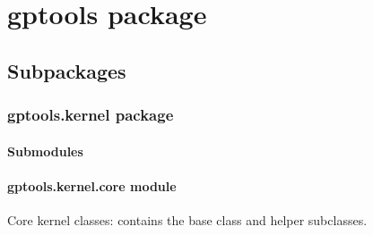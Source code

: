\documentclass[letterpaper,10pt,english]{sphinxmanual}
\begin{document}
\section{gptools package}
\label{gptools:gptools-package}\label{gptools::doc}

\subsection{Subpackages}
\label{gptools:subpackages}

\subsubsection{gptools.kernel package}
\label{gptools.kernel::doc}\label{gptools.kernel:gptools-kernel-package}

\paragraph{Submodules}
\label{gptools.kernel:submodules}

\paragraph{gptools.kernel.core module}
\label{gptools.kernel:gptools-kernel-core-module}\label{gptools.kernel:module-gptools.kernel.core}
Core kernel classes: contains the base {\hyperref[gptools.kernel:gptools.kernel.core.Kernel]{}} class and helper subclasses.
\end{document}

